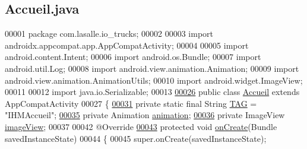 \hypertarget{_accueil_8java_source}{}\subsection{Accueil.\+java}
\label{_accueil_8java_source}

\begin{DoxyCode}
00001 \textcolor{keyword}{package }com.lasalle.io\_trucks;
00002 
00003 \textcolor{keyword}{import} androidx.appcompat.app.AppCompatActivity;
00004 
00005 \textcolor{keyword}{import} android.content.Intent;
00006 \textcolor{keyword}{import} android.os.Bundle;
00007 \textcolor{keyword}{import} android.util.Log;
00008 \textcolor{keyword}{import} android.view.animation.Animation;
00009 \textcolor{keyword}{import} android.view.animation.AnimationUtils;
00010 \textcolor{keyword}{import} android.widget.ImageView;
00011 
00012 \textcolor{keyword}{import} java.io.Serializable;
00013 
\hyperlink{classcom_1_1lasalle_1_1io__trucks_1_1_accueil}{00026} \textcolor{keyword}{public} \textcolor{keyword}{class }\hyperlink{classcom_1_1lasalle_1_1io__trucks_1_1_accueil}{Accueil} \textcolor{keyword}{extends} AppCompatActivity
00027 \{
\hyperlink{classcom_1_1lasalle_1_1io__trucks_1_1_accueil_a1a3ee3728fab660903bb4399a2e49d49}{00031}     \textcolor{keyword}{private} \textcolor{keyword}{static} \textcolor{keyword}{final} String \hyperlink{classcom_1_1lasalle_1_1io__trucks_1_1_accueil_a1a3ee3728fab660903bb4399a2e49d49}{TAG} = \textcolor{stringliteral}{"IHMAccueil"};
\hyperlink{classcom_1_1lasalle_1_1io__trucks_1_1_accueil_a61fc1cafddccd078251374fa264adc4f}{00035}     \textcolor{keyword}{private} Animation \hyperlink{classcom_1_1lasalle_1_1io__trucks_1_1_accueil_a61fc1cafddccd078251374fa264adc4f}{animation};
\hyperlink{classcom_1_1lasalle_1_1io__trucks_1_1_accueil_a63484f52fc632e91aad7275ea7be0f7b}{00036}     \textcolor{keyword}{private} ImageView \hyperlink{classcom_1_1lasalle_1_1io__trucks_1_1_accueil_a63484f52fc632e91aad7275ea7be0f7b}{imageView};
00037 
00042     @Override
\hyperlink{classcom_1_1lasalle_1_1io__trucks_1_1_accueil_acd7cff413b44344de6b037c85f4f50bb}{00043}     \textcolor{keyword}{protected} \textcolor{keywordtype}{void} \hyperlink{classcom_1_1lasalle_1_1io__trucks_1_1_accueil_acd7cff413b44344de6b037c85f4f50bb}{onCreate}(Bundle savedInstanceState)
00044     \{
00045         super.onCreate(savedInstanceState);

\end{DoxyCode}
